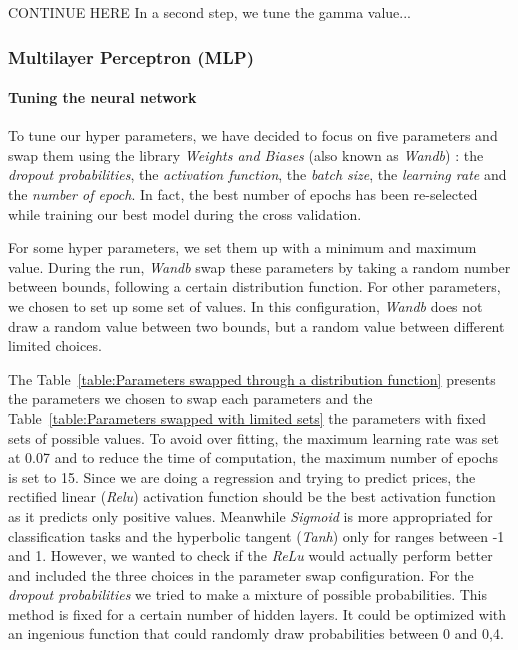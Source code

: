\documentclass[12pt]{article}
\begin{document}

CONTINUE HERE
In a second step, we tune the gamma value...


\subsubsection{Multilayer Perceptron (MLP)}

\paragraph{Tuning the neural network}

\noindent To tune our hyper parameters, we have decided to focus on five parameters and swap them using the library \textit{Weights and Biases} (also known as \textit{Wandb}) : the \textit{dropout probabilities}, the \textit{activation function}, the \textit{batch size}, the \textit{learning rate} and the \textit{number of epoch}. In fact, the best number of epochs has been re-selected while training our best model during the cross validation.

\noindent For some hyper parameters, we set them up with a minimum and maximum value. During the run, \textit{Wandb} swap these parameters by taking a random number between bounds, following a certain distribution function. For other parameters, we chosen to set up some set of values. In this configuration, \textit{Wandb} does not draw a random value between two bounds, but a random value between different limited choices.


\noindent The Table~\ref{table:Parameters swapped through a distribution function} presents the parameters we chosen to swap each parameters and the Table~\ref{table:Parameters swapped with limited sets} the parameters with fixed sets of possible values. 
To avoid over fitting, the maximum learning rate was set at 0.07 and to reduce the time of computation, the maximum number of epochs is set to 15. Since we are doing a regression and trying to predict prices, the rectified linear (\textit{Relu}) activation function should be the best activation function as it predicts only positive values. Meanwhile \textit{Sigmoid} is more appropriated for classification tasks and the hyperbolic tangent (\textit{Tanh}) only for ranges between -1 and 1. However, we wanted to check if the \textit{ReLu} would actually perform better and included the three choices in the parameter swap configuration.
\noindent For the \textit{dropout probabilities} we tried to make a mixture of possible probabilities. This method is fixed for a certain number of hidden layers. It could be optimized with an ingenious function that could randomly draw probabilities between 0 and 0,4.
\end{document}
